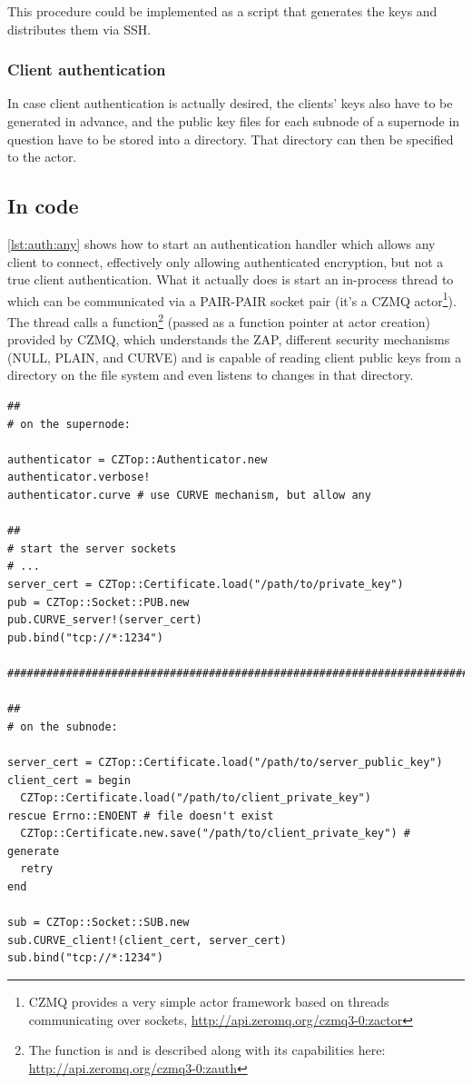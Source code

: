 This procedure could be implemented as a script that generates the keys and
distributes them via \gls{SSH}.

\subsubsection{Client authentication}
In case client authentication is actually desired, the clients' keys also have
to be generated in advance, and the public key files for each subnode of a
supernode in question have to be stored into a directory. That directory can
then be specified to the  actor.

\subsection{In code}
\autoref{lst:auth:any} shows how to start an authentication handler which
allows any client to connect, effectively only allowing authenticated
encryption, but not a true client authentication. What it actually does is
start an in-process thread to which can be communicated via a PAIR-PAIR socket
pair (it's a CZMQ actor\footnote{CZMQ provides a very simple actor framework
based on threads communicating over \zmq sockets,
\url{http://api.zeromq.org/czmq3-0:zactor}}). The thread calls a
function\footnote{The function is  and is described along
with its capabilities here: \url{http://api.zeromq.org/czmq3-0:zauth}} (passed
as a function pointer at actor creation) provided by CZMQ, which understands
the \gls{ZAP}, different security mechanisms (NULL, PLAIN, and CURVE) and is
capable of reading client public keys from a directory on the file system and
even listens to changes in that directory.

\begin{lstlisting}[style=customruby,caption={Starting an authentication handler that allows any clients}, label={lst:auth:any}]
##
# on the supernode:

authenticator = CZTop::Authenticator.new
authenticator.verbose!
authenticator.curve # use CURVE mechanism, but allow any

##
# start the server sockets
# ...
server_cert = CZTop::Certificate.load("/path/to/private_key")
pub = CZTop::Socket::PUB.new
pub.CURVE_server!(server_cert)
pub.bind("tcp://*:1234")

#############################################################################

##
# on the subnode:

server_cert = CZTop::Certificate.load("/path/to/server_public_key")
client_cert = begin
  CZTop::Certificate.load("/path/to/client_private_key")
rescue Errno::ENOENT # file doesn't exist
  CZTop::Certificate.new.save("/path/to/client_private_key") # generate
  retry
end

sub = CZTop::Socket::SUB.new
sub.CURVE_client!(client_cert, server_cert)
sub.bind("tcp://*:1234")
\end{lstlisting}


